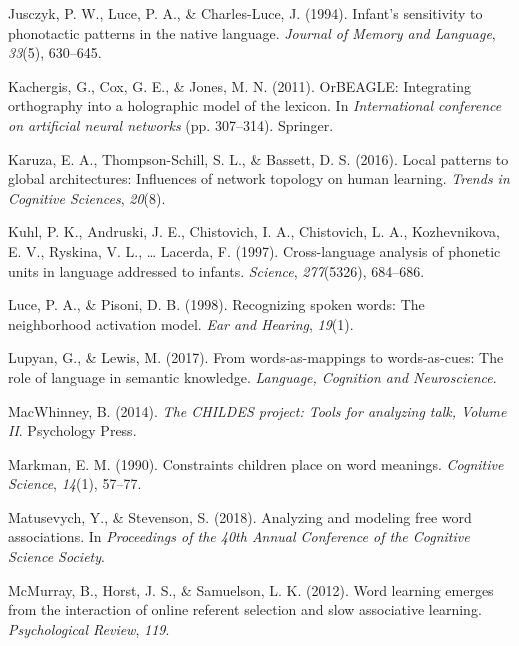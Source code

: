 \documentclass[english,,man,floatsintext]{apa6}
\begin{document}
\leavevmode\hypertarget{ref-jusczyk1994}{}%
Jusczyk, P. W., Luce, P. A., \& Charles-Luce, J. (1994). Infant's sensitivity to phonotactic patterns in the native language. \emph{Journal of Memory and Language}, \emph{33}(5), 630--645.

\leavevmode\hypertarget{ref-kachergis2011}{}%
Kachergis, G., Cox, G. E., \& Jones, M. N. (2011). OrBEAGLE: Integrating orthography into a holographic model of the lexicon. In \emph{International conference on artificial neural networks} (pp. 307--314). Springer.

\leavevmode\hypertarget{ref-karuza2016}{}%
Karuza, E. A., Thompson-Schill, S. L., \& Bassett, D. S. (2016). Local patterns to global architectures: Influences of network topology on human learning. \emph{Trends in Cognitive Sciences}, \emph{20}(8).

\leavevmode\hypertarget{ref-kuhl1997}{}%
Kuhl, P. K., Andruski, J. E., Chistovich, I. A., Chistovich, L. A., Kozhevnikova, E. V., Ryskina, V. L., \ldots{} Lacerda, F. (1997). Cross-language analysis of phonetic units in language addressed to infants. \emph{Science}, \emph{277}(5326), 684--686.

\leavevmode\hypertarget{ref-luce1998}{}%
Luce, P. A., \& Pisoni, D. B. (1998). Recognizing spoken words: The neighborhood activation model. \emph{Ear and Hearing}, \emph{19}(1).

\leavevmode\hypertarget{ref-lupyan2017}{}%
Lupyan, G., \& Lewis, M. (2017). From words-as-mappings to words-as-cues: The role of language in semantic knowledge. \emph{Language, Cognition and Neuroscience}.

\leavevmode\hypertarget{ref-macwhinney2014}{}%
MacWhinney, B. (2014). \emph{The CHILDES project: Tools for analyzing talk, Volume II}. Psychology Press.

\leavevmode\hypertarget{ref-markman90}{}%
Markman, E. M. (1990). Constraints children place on word meanings. \emph{Cognitive Science}, \emph{14}(1), 57--77.

\leavevmode\hypertarget{ref-matusevych2018}{}%
Matusevych, Y., \& Stevenson, S. (2018). Analyzing and modeling free word associations. In \emph{Proceedings of the 40th Annual Conference of the Cognitive Science Society}.

\leavevmode\hypertarget{ref-mcmurray2012}{}%
McMurray, B., Horst, J. S., \& Samuelson, L. K. (2012). Word learning emerges from the interaction of online referent selection and slow associative learning. \emph{Psychological Review}, \emph{119}.
\end{document}
